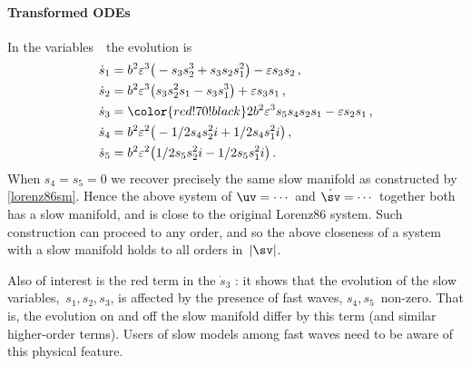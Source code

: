 \paragraph{Transformed ODEs} 
In the variables~\sv\ the evolution is
\begin{align*}&
\dot s_{1}=b^{2} \eps^{3} \big(-s_{3} s_{2}^{3}+s_{3} s_{2} s_{1}^{2}
\big)-\eps s_{3} s_{2}
\,, \\&
\dot s_{2}=b^{2} \eps^{3} \big(s_{3} s_{2}^{2} s_{1}-s_{3} s_{1}^{3}
\big)+\eps s_{3} s_{1}
\,, \\&
\dot s_{3}={\color{red!70!black}2 b^{2} \eps^{3} s_{5} s_{4} s_{2} s_{1}}-\eps s_{2} s_{1}
\,, \\&
\dot s_{4}=b^{2} \eps^{2} \big(-1/2 s_{4} s_{2}^{2} i+1/2 s_{4} s_{1}^{2
} i\big)
\,, \\&
\dot s_{5}=b^{2} \eps^{2} \big(1/2 s_{5} s_{2}^{2} i-1/2 s_{5} s_{1}^{2}
 i\big)
\,.
\end{align*}
When \(s_4=s_5=0\) we recover precisely the same slow manifold as constructed by \cref{lorenz86sm}.
Hence the above system of \(\uv=\cdots\) and \(\dot{\sv}=\cdots\) together both has a slow manifold, and is  close to the original Lorenz86 system.
Such construction can proceed to any order, and so the above closeness of a system with a slow manifold holds to all orders in~\(|\sv|\).

Also of interest is the red term in the \(\dot s_3\) \ode: it shows that the evolution of the slow variables,~\(s_1,s_2,s_3\), is affected by the presence of fast waves, \(s_4,s_5\)~non-zero.
That is, the evolution on and off the slow manifold differ by this term (and similar higher-order terms).
Users of slow models among fast waves need to be aware of this physical feature.




